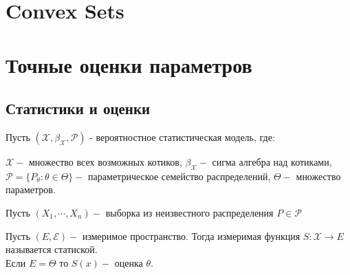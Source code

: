 \documentclass[11pt,fleqn]{book} %
\begin{document}

\pagestyle{fancy} %


\chapter{Convex Sets}
\chapter{Точные оценки параметров}
\section{Статистики и оценки}
Пусть $(\mathcal{X}, \mathcal{\beta}_{\mathcal{X}}, \mathcal{P})$ - вероятностное статистическая модель, где: 
\begin{remark}
$\mathcal{X} - $ множество всех возможных котиков,
$\mathcal{\beta}_\mathcal{X} - $  сигма алгебра над котиками,
$\mathcal{P} =  \{P_\theta : \theta \in \Theta\} - $  параметрическое семейство распределений,
$\Theta - $ множество параметров.
\end{remark}
Пусть $(X_1, \cdots, X_n) - $ выборка из неизвестного распределения $P \in \mathcal{P}$
\begin{defi}[Статистика]
Пусть $(E, \mathcal{E}) - $ измеримое пространство. Тогда измеримая функция $S:\mathcal{X} \rightarrow E$  называется статиской. \\
Если $E = \Theta$ то $S(x) - $ оценка $\theta$.
\end{defi}
\end{document}
